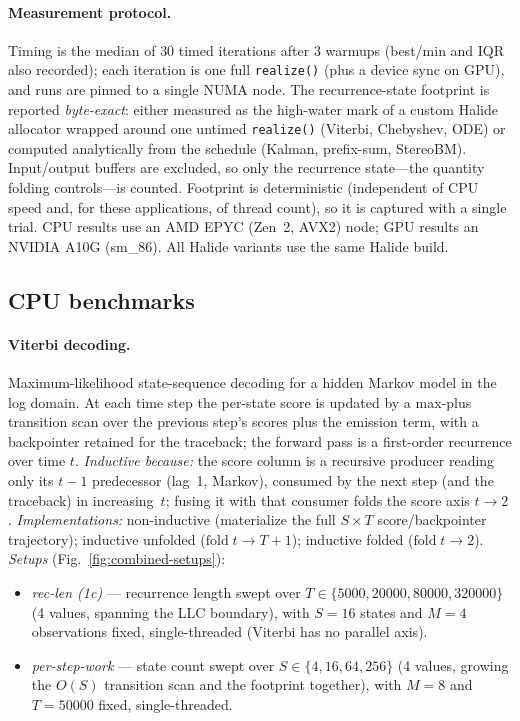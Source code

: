\paragraph{Measurement protocol.}
Timing is the median of $30$ timed iterations after $3$ warmups (best/min and IQR
also recorded); each iteration is one full \texttt{realize()} (plus a device sync
on GPU), and runs are pinned to a single NUMA node. The recurrence-state
footprint is reported \emph{byte-exact}: either measured as the high-water mark of
a custom Halide allocator wrapped around one untimed \texttt{realize()} (Viterbi,
Chebyshev, ODE) or computed analytically from the schedule (Kalman, prefix-sum,
StereoBM). Input/output buffers are excluded, so only the recurrence state---the
quantity folding controls---is counted. Footprint is deterministic (independent of
CPU speed and, for these applications, of thread count), so it is captured with a
single trial. CPU results use an AMD EPYC (Zen~2, AVX2) node; GPU results an
NVIDIA A10G (sm\_86). All Halide variants use the same Halide build.

\subsection{CPU benchmarks}

\paragraph{Viterbi decoding.}
Maximum-likelihood state-sequence decoding for a hidden Markov model in the log
domain. At each time step the per-state score is updated by a max-plus transition
scan over the previous step's scores plus the emission term, with a backpointer
retained for the traceback; the forward pass is a first-order recurrence over time
$t$.
\emph{Inductive because:} the score column is a recursive producer reading only its
$t{-}1$ predecessor (lag~1, Markov), consumed by the next step (and the traceback)
in increasing~$t$; fusing it with that consumer folds the score axis $t\!\to\!2$.
\emph{Implementations:} non-inductive (materialize the full $S\times T$
score/backpointer trajectory); inductive unfolded ($\mathrm{fold}\;t\!\to\!T{+}1$);
inductive folded ($\mathrm{fold}\;t\!\to\!2$).
\emph{Setups} (Fig.~\ref{fig:combined-setups}):
\begin{itemize}\itemsep2pt
  \item \textit{rec-len (1c)} --- recurrence length swept over
    $T\in\{5000,20000,80000,320000\}$ (4 values, spanning the LLC boundary), with
    $S{=}16$ states and $M{=}4$ observations fixed, single-threaded (Viterbi has no
    parallel axis).
  \item \textit{per-step-work} --- state count swept over $S\in\{4,16,64,256\}$
    (4 values, growing the $O(S)$ transition scan and the footprint together),
    with $M{=}8$ and $T{=}50000$ fixed, single-threaded.
\end{itemize}


